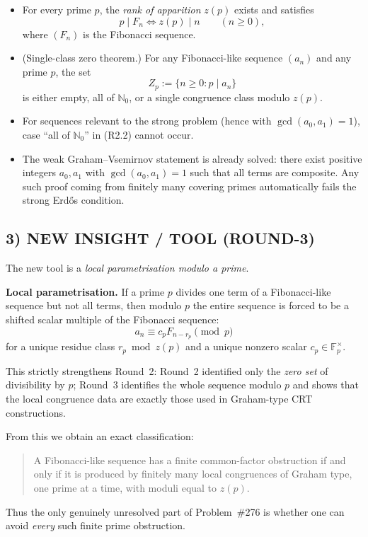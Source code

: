 \begin{itemize}
\item[(R2.1)] For every prime $p$, the \emph{rank of apparition} $z(p)$ exists and satisfies
\[
p\mid F_n \iff z(p)\mid n \qquad (n\ge 0),
\]
where $(F_n)$ is the Fibonacci sequence.

\item[(R2.2)] (Single-class zero theorem.) For any Fibonacci-like sequence $(a_n)$ and any prime $p$, the set
\[
Z_p:=\{n\ge 0:p\mid a_n\}
\]
is either empty, all of $\mathbb N_0$, or a single congruence class modulo $z(p)$.

\item[(R2.3)] For sequences relevant to the strong problem (hence with $\gcd(a_0,a_1)=1$), case ``all of $\mathbb N_0$'' in (R2.2) cannot occur.

\item[(R2.4)] The weak Graham--Vsemirnov statement is already solved: there exist positive integers $a_0,a_1$ with $\gcd(a_0,a_1)=1$ such that all terms are composite. Any such proof coming from finitely many covering primes automatically fails the strong Erd\H{o}s condition.
\end{itemize}

\subsection*{3) NEW INSIGHT / TOOL (ROUND-3)}
The new tool is a \emph{local parametrisation modulo a prime}.

\medskip
\noindent\textbf{Local parametrisation.}
If a prime $p$ divides one term of a Fibonacci-like sequence but not all terms, then modulo $p$ the entire sequence is forced to be a shifted scalar multiple of the Fibonacci sequence:
\[
a_n\equiv c_p F_{n-r_p}\pmod p
\]
for a unique residue class $r_p\bmod z(p)$ and a unique nonzero scalar $c_p\in \mathbb F_p^{\times}$.

This strictly strengthens Round~2: Round~2 identified only the \emph{zero set} of divisibility by $p$; Round~3 identifies the whole sequence modulo $p$ and shows that the local congruence data are exactly those used in Graham-type CRT constructions.

From this we obtain an exact classification:
\begin{quote}
A Fibonacci-like sequence has a finite common-factor obstruction if and only if it is produced by finitely many local congruences of Graham type, one prime at a time, with moduli equal to $z(p)$.
\end{quote}
Thus the only genuinely unresolved part of Problem~\#276 is whether one can avoid \emph{every} such finite prime obstruction.

